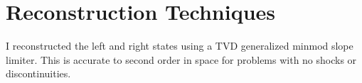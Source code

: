 \section{Reconstruction Techniques}
I reconstructed the left and right states using a TVD generalized minmod slope limiter. This is accurate to second order in space for problems with no shocks or discontinuities.
